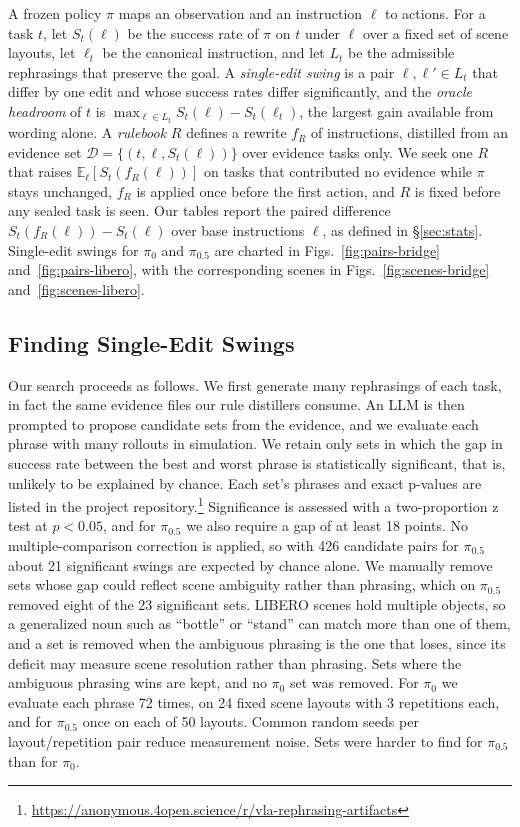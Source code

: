 \documentclass[letterpaper, 10 pt, conference]{ieeeconf} %
\newcommand{\artifactsrepo}{https://anonymous.4open.science/r/vla-rephrasing-artifacts}
\newcommand{\artifactsrepo}{https://github.com/sttawm/vla-rephrasing-artifacts}
\begin{document}
A frozen policy $\pi$ maps an observation and an instruction $\ell$ to actions. For a task $t$, let $S_t(\ell)$ be the success rate of $\pi$ on $t$ under $\ell$ over a fixed set of scene layouts, let $\ell_t$ be the canonical instruction, and let $L_t$ be the admissible rephrasings that preserve the goal. A \emph{single-edit swing} is a pair $\ell, \ell' \in L_t$ that differ by one edit and whose success rates differ significantly, and the \emph{oracle headroom} of $t$ is $\max_{\ell \in L_t} S_t(\ell) - S_t(\ell_t)$, the largest gain available from wording alone. A \emph{rulebook} $R$ defines a rewrite $f_R$ of instructions, distilled from an evidence set $\mathcal{D} = \{(t, \ell, S_t(\ell))\}$ over evidence tasks only. We seek one $R$ that raises $\mathbb{E}_{\ell}[S_t(f_R(\ell))]$ on tasks that contributed no evidence while $\pi$ stays unchanged, $f_R$ is applied once before the first action, and $R$ is fixed before any sealed task is seen. Our tables report the paired difference $S_t(f_R(\ell)) - S_t(\ell)$ over base instructions $\ell$, as defined in \S\ref{sec:stats}. Single-edit swings for $\pi_0$ and $\pi_{0.5}$ are charted in Figs.~\ref{fig:pairs-bridge} and~\ref{fig:pairs-libero}, with the corresponding scenes in Figs.~\ref{fig:scenes-bridge} and~\ref{fig:scenes-libero}.

\subsection{Finding Single-Edit Swings}
\label{sec:swings}

Our search proceeds as follows. We first generate many rephrasings of each task, in fact the same evidence files our rule distillers consume. An LLM is then prompted to propose candidate sets from the evidence, and we evaluate each phrase with many rollouts in simulation. We retain only sets in which the gap in success rate between the best and worst phrase is statistically significant, that is, unlikely to be explained by chance. Each set's phrases and exact p-values are listed in the project repository.\footnote{\url{\artifactsrepo}\label{fn:repo}}
Significance is assessed with a two-proportion z test at $p<0.05$, and for $\pi_{0.5}$ we also require a gap of at least 18 points. No multiple-comparison correction is applied, so with 426 candidate pairs for $\pi_{0.5}$ about 21 significant swings are expected by chance alone. We manually remove sets whose gap could reflect scene ambiguity rather than phrasing, which on $\pi_{0.5}$ removed eight of the 23 significant sets. LIBERO scenes hold multiple objects, so a generalized noun such as ``bottle'' or ``stand'' can match more than one of them, and a set is removed when the ambiguous phrasing is the one that loses, since its deficit may measure scene resolution rather than phrasing. Sets where the ambiguous phrasing wins are kept, and no $\pi_0$ set was removed.
For $\pi_0$ we evaluate each phrase 72 times, on 24 fixed scene layouts with 3 repetitions each, and for $\pi_{0.5}$ once on each of 50 layouts. Common random seeds per layout/repetition pair reduce measurement noise. Sets were harder to find for $\pi_{0.5}$ than for $\pi_0$.
\end{document}
